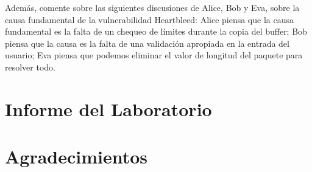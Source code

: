 Además, comente sobre las siguientes discusiones de Alice, Bob y
Eva, sobre la causa fundamental de la vulnerabilidad Heartbleed:
Alice piensa que la causa fundamental es la falta de un chequeo de límites durante la copia del buffer; Bob piensa que la causa es la falta de una validación apropiada en la entrada del usuario; Eva piensa que podemos eliminar el valor de longitud del paquete para resolver todo.



\section{Informe del Laboratorio}




\section*{Agradecimientos}






